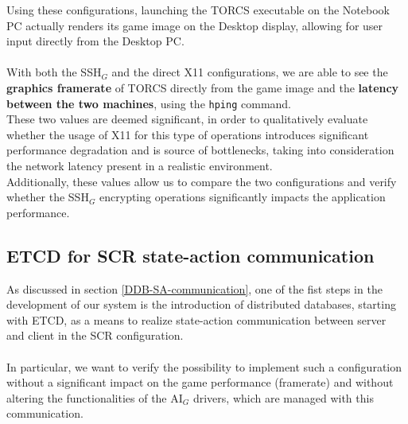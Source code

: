 Using these configurations, launching the TORCS executable on the Notebook PC actually renders its game image on the Desktop display, allowing for user input directly from the Desktop PC. \\ \\
With both the SSH$_G$ and the direct X11 configurations, we are able to see the \textbf{graphics framerate} of TORCS directly from the game image and the \textbf{latency between the two machines}, using the \texttt{hping} command. \\
These two values are deemed significant, in order to qualitatively evaluate whether the usage of X11 for this type of operations introduces significant performance degradation and is source of bottlenecks, taking into consideration the network latency present in a realistic environment. \\ Additionally, these values allow us to compare the two configurations and verify whether the SSH$_G$ encrypting operations significantly impacts the application performance.  

\subsection{ETCD for SCR state-action communication}
As discussed in section \ref{DDB-SA-communication}, one of the fist steps in the development of our system is the introduction of distributed databases, starting with ETCD, as a means to realize state-action communication between server and client in the SCR configuration. \\ \\
In particular, we want to verify the possibility to implement such a configuration without a significant impact on the game performance (framerate) and without altering the functionalities of the AI$_G$ drivers, which are managed with this communication.

